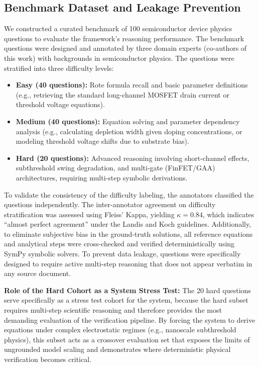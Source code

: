 \documentclass[a4paper,fleqn]{cas-sc}
\begin{document}
\subsection{Benchmark Dataset and Leakage Prevention}
We constructed a curated benchmark of 100 semiconductor device physics questions to evaluate the framework's reasoning performance. The benchmark questions were designed and annotated by three domain experts (co-authors of this work) with backgrounds in semiconductor physics. The questions were stratified into three difficulty levels:
\begin{itemize}
    \item \textbf{Easy (40 questions):} Rote formula recall and basic parameter definitions (e.g., retrieving the standard long-channel MOSFET drain current or threshold voltage equations).
    \item \textbf{Medium (40 questions):} Equation solving and parameter dependency analysis (e.g., calculating depletion width given doping concentrations, or modeling threshold voltage shifts due to substrate bias).
    \item \textbf{Hard (20 questions):} Advanced reasoning involving short-channel effects, subthreshold swing degradation, and multi-gate (FinFET/GAA) architectures, requiring multi-step symbolic derivations.
\end{itemize}
To validate the consistency of the difficulty labeling, the annotators classified the questions independently. The inter-annotator agreement on difficulty stratification was assessed using Fleiss' Kappa, yielding $\kappa = 0.84$, which indicates ``almost perfect agreement'' under the Landis and Koch guidelines. Additionally, to eliminate subjective bias in the ground-truth solutions, all reference equations and analytical steps were cross-checked and verified deterministically using SymPy symbolic solvers. To prevent data leakage, questions were specifically designed to require active multi-step reasoning that does not appear verbatim in any source document.

\noindent \textbf{Role of the Hard Cohort as a System Stress Test:} The 20 hard questions serve specifically as a stress test cohort for the system, because the hard subset requires multi-step scientific reasoning and therefore provides the most demanding evaluation of the verification pipeline. By forcing the system to derive equations under complex electrostatic regimes (e.g., nanoscale subthreshold physics), this subset acts as a crossover evaluation set that exposes the limits of ungrounded model scaling and demonstrates where deterministic physical verification becomes critical.
\end{document}
